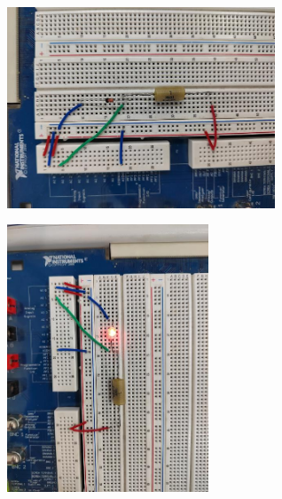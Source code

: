 \documentclass[UTF8]{article}
\theoremstyle{MyLineTheoremStyle} %
\theoremstyle{MyBlockTheoremStyle} %
\theoremstyle{MySubsubsectionStyle} %
\begin{document}
\begin{figure}[H]\centering
    \begin{subfigure}[b]{0.5\columnwidth}\centering
        \includegraphics[height=170pt]{assets/附录/IMG_20241015_163203.jpg}
    \end{subfigure}\hfill
    \begin{subfigure}[b]{0.5\columnwidth}\centering
        \includegraphics[width=170pt, angle=90]{assets/附录/IMG_20241015_163454.jpg}
    \end{subfigure}
\end{figure}
\end{document}
